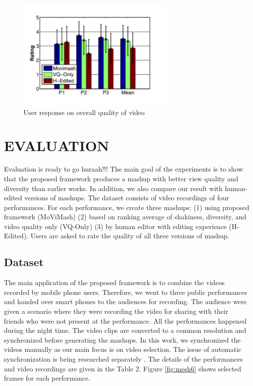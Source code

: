 \documentclass{sig-alternate}
\begin{document}
\begin{figure}[h]
	\centering
    \includegraphics{img8.png}
    \caption{User response on overall quality of video}
    \label{fig:mesh8}
\end{figure}


\section{EVALUATION}
Evaluation is ready to go huraah!!!
The main goal of the experiments is to show that the proposed
framework produces a mashup with better view quality and diversity than earlier works. In addition, we also compare our result with
human-edited versions of mashups. The dataset consists of video
recordings of four performances. For each performance, we create three mashups: (1) using proposed framework (MoViMash) (2)
based on ranking average of shakiness, diversity, and video quality only (VQ-Only) (3) by human editor with editing experience (H-Edited). Users are asked to rate the quality of all three versions of mashup.

\subsection{Dataset}
The main application of the proposed framework is to combine
the videos recorded by mobile phone users. Therefore, we went to
three public performances and handed over smart phones to the audiences for recording. The audience were given a scenario where
they were recording the video for sharing with their friends who
were not present at the performance. All the performances happened during the night time. The video clips are converted to a
common resolution and synchronized before generating the mashups.
In this work, we synchronized the videos manually as our main focus is on video selection. The issue of automatic synchronization is
being researched separately \cite{14}. The details of the performances
and video recordings are given in the Table 2. Figure \ref{fig:mesh6} shows selected frames for each performance.
\end{document}
